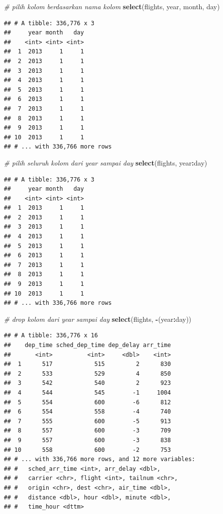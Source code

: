\documentclass[]{book}
\newenvironment{Shaded}{\begin{snugshade}}{\end{snugshade}}
\newcommand{\KeywordTok}[1]{\textcolor[rgb]{0.13,0.29,0.53}{\textbf{#1}}}
\newcommand{\CommentTok}[1]{\textcolor[rgb]{0.56,0.35,0.01}{\textit{#1}}}
\newcommand{\OperatorTok}[1]{\textcolor[rgb]{0.81,0.36,0.00}{\textbf{#1}}}
\newcommand{\NormalTok}[1]{#1}
\begin{document}
\begin{Shaded}
\begin{Highlighting}[]
\CommentTok{# pilih kolom berdasarkan nama kolom}
\KeywordTok{select}\NormalTok{(flights, year, month, day)}
\end{Highlighting}
\end{Shaded}

\begin{verbatim}
## # A tibble: 336,776 x 3
##     year month   day
##    <int> <int> <int>
##  1  2013     1     1
##  2  2013     1     1
##  3  2013     1     1
##  4  2013     1     1
##  5  2013     1     1
##  6  2013     1     1
##  7  2013     1     1
##  8  2013     1     1
##  9  2013     1     1
## 10  2013     1     1
## # ... with 336,766 more rows
\end{verbatim}

\begin{Shaded}
\begin{Highlighting}[]
\CommentTok{# pilih seluruh kolom dari year sampai day}
\KeywordTok{select}\NormalTok{(flights, year}\OperatorTok{:}\NormalTok{day)}
\end{Highlighting}
\end{Shaded}

\begin{verbatim}
## # A tibble: 336,776 x 3
##     year month   day
##    <int> <int> <int>
##  1  2013     1     1
##  2  2013     1     1
##  3  2013     1     1
##  4  2013     1     1
##  5  2013     1     1
##  6  2013     1     1
##  7  2013     1     1
##  8  2013     1     1
##  9  2013     1     1
## 10  2013     1     1
## # ... with 336,766 more rows
\end{verbatim}

\begin{Shaded}
\begin{Highlighting}[]
\CommentTok{# drop kolom dari year sampai day}
\KeywordTok{select}\NormalTok{(flights, }\OperatorTok{-}\NormalTok{(year}\OperatorTok{:}\NormalTok{day))}
\end{Highlighting}
\end{Shaded}

\begin{verbatim}
## # A tibble: 336,776 x 16
##    dep_time sched_dep_time dep_delay arr_time
##       <int>          <int>     <dbl>    <int>
##  1      517            515         2      830
##  2      533            529         4      850
##  3      542            540         2      923
##  4      544            545        -1     1004
##  5      554            600        -6      812
##  6      554            558        -4      740
##  7      555            600        -5      913
##  8      557            600        -3      709
##  9      557            600        -3      838
## 10      558            600        -2      753
## # ... with 336,766 more rows, and 12 more variables:
## #   sched_arr_time <int>, arr_delay <dbl>,
## #   carrier <chr>, flight <int>, tailnum <chr>,
## #   origin <chr>, dest <chr>, air_time <dbl>,
## #   distance <dbl>, hour <dbl>, minute <dbl>,
## #   time_hour <dttm>
\end{verbatim}
\end{document}
